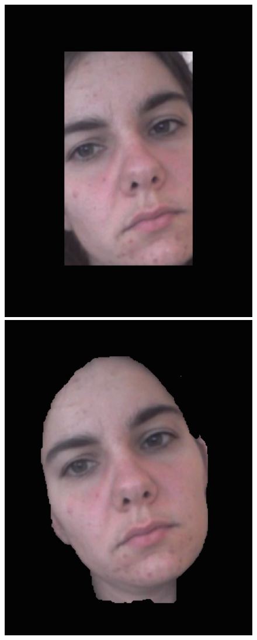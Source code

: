 \documentclass[10pt,twocolumn,letterpaper]{article}
\begin{document}
\begin{figure}
\begin{center}
	\includegraphics[scale=0.25]{figures/tilt_bb}
	\includegraphics[scale=0.25]{figures/tilt_segment}\\

\end{center}
\end{figure}
\end{document}

